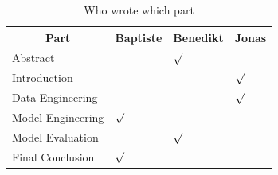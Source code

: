\documentclass[a4paper]{article}
\begin{document}
\begin{table}[H]
\caption{Who wrote which part}
\label{tbl:who}
\centering
\begin{tabular}{@{}llll@{}}
\toprule
\multicolumn{1}{c}{Part} & Baptiste   & Benedikt  & Jonas  \\ \midrule
Abstract                     			& & $\surd$  & \\
Introduction                 			&   &  & $\surd$ \\
Data Engineering             			&   &  & $\surd$ \\
Model Engineering 						& $\surd$ & & \\ 
Model Evaluation 						& & $\surd$  & \\
Final Conclusion						& $\surd$ & & \\ 
\bottomrule
\end{tabular}
\end{table}
\end{document}
